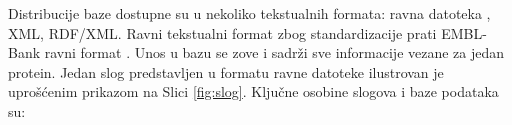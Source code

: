 Distribucije \swissprot baze dostupne su u nekoliko tekstualnih formata: ravna
datoteka , XML, RDF/XML.  Ravni tekstualni format zbog
standardizacije prati EMBL-Bank ravni format \parencite{svisprot2003}.
Unos u bazu se zove   i sadrži sve informacije vezane
za jedan protein.  Jedan slog predstavljen u formatu ravne datoteke ilustrovan
je uprošćenim prikazom  na Slici \ref{fig:slog}.  Ključne osobine slogova i
\swissprot baze podataka su:


